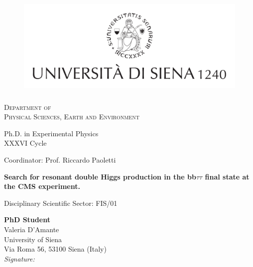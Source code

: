 \begin{titlepage}
%
\begin{figure}[ht]
\centering
\includegraphics[height=50mm]{LOGO_UNISI_ESTESO_SIGILLO_SOPRA_NERO_0.pdf}
\end{figure}
%
\begin{center}
{\scshape \large
Department of \\Physical Sciences, Earth and Environment
}



{\large
Ph.D. in Experimental Physics \\
{ XXXVI Cycle}
}

\vspace{10mm}
{\large
Coordinator: Prof. Riccardo Paoletti
}

\vspace{10mm}

\begin{spacing}{2.0}
{\huge \bf Search for resonant double Higgs production in the bb$\tau\tau$ final state at the CMS experiment.}
\end{spacing}

\vspace{5mm}
{\large
Disciplinary Scientific Sector: FIS/01
}
\end{center}
\vspace{1cm}

\noindent
\textbf{PhD Student}\\
Valeria D'Amante\\
University of Siena\\
Via Roma 56, 53100 Siena (Italy)\\

\hspace{4cm} \textit{Signature:}\\
\vspace{5mm}


\end{titlepage}
